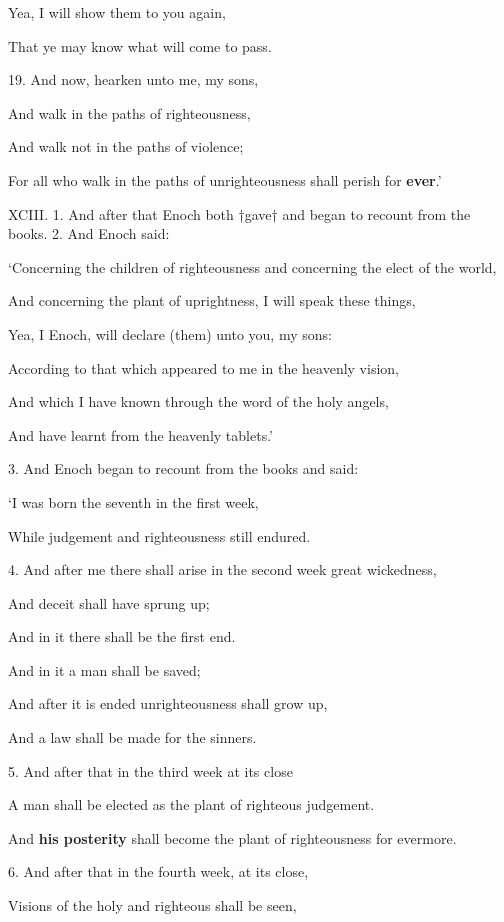 Yea, I will show them to you again,

That ye may know what will come to pass.

19. And now, hearken unto me, my sons,

And walk in the paths of righteousness,

And walk not in the paths of violence;

For all who walk in the paths of unrighteousness shall perish for \textbf{ever}.’


XCIII. 1. And after that Enoch both †gave† and
began to recount from the books. 2. And Enoch said:

‘Concerning the children of righteousness and concerning the elect of the world,

And concerning the plant of uprightness, I will speak these things,

Yea, I Enoch, will declare (them) unto you, my sons:

According to that which appeared to me in the heavenly vision,

And which I have known through the word of the holy angels,

And have learnt from the heavenly tablets.’

3. And Enoch began to recount from the books and said:

‘I was born the seventh in the first week,

While judgement and righteousness still endured.

4. And after me there shall arise in the second week great wickedness,

And deceit shall have sprung up;

And in it there shall be the first end.

And in it a man shall be saved;

And after it is ended unrighteousness shall grow up,

And a law shall be made for the sinners.

5. And after that in the third week at its close

A man shall be elected as the plant of righteous judgement.

And \textbf{his posterity} shall become the plant of righteousness for evermore.

6. And after that in the fourth week, at its close,

Visions of the holy and righteous shall be seen,

